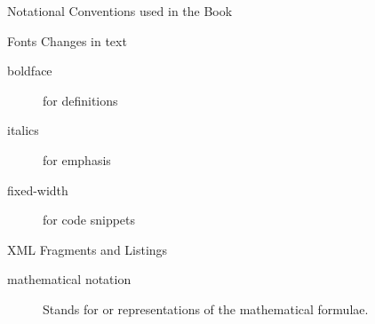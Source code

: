 
\begin{tchapter}[id=notation]{Notational Conventions used in the Book}

\begin{tsection}[id=notation:fonts]{Fonts Changes in text}
  \begin{description}
  \item[boldface] for definitions
  \item[italics] for emphasis
  \item[fixed-width] for code snippets
  \end{description}
\end{tsection}

\begin{tsection}[id=notation:xml]{XML Fragments and Listings}
  \begin{description}
  \item[mathematical notation] Stands for {\openmath} or {\cmathml} representations of the
    mathematical formulae.
  \end{description}
\end{tsection}
\end{tchapter}
